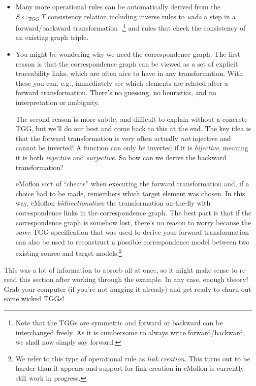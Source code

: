 \begin{itemize}

\item Many more operational rules can be automatically derived from the $S \Leftrightarrow_{TGG} T$ consistency relation including inverse rules to \emph{undo} a step in a forward/backward transformation~\cite{LAVS_ICGT_2012},\footnote{Note that the TGGs are symmetric and forward or backward can be interchanged freely. 
As it is cumbersome to always write forward/backward, we shall now simply say forward.} and rules that check the consistency of an existing graph triple.

\item You might be wondering why we need the correspondence graph. 
The first reason is that the correspondence graph can be viewed as a set of explicit traceability links, which are often nice to have in any transformation. 
With these you can, e.g., immediately see which elements are related after a forward transformation. 
There's no guessing, no heuristics, and no interpretation or ambiguity.

\vspace{0.25cm}

The second reason is more subtle, and difficult to explain without a concrete TGG, but we'll do our best and come back to this at the end. 
The key idea is that the forward transformation is very often actually \emph{not} injective and cannot be inverted! 
A function can only be inverted if it is \emph{bijective}, meaning it is both \emph{injective} and \emph{surjective}. 
So how can we derive the backward transformation?

\vspace{0.25cm}

eMoflon sort of ``cheats'' when executing the forward transformation and, if a choice had to be made, remembers which target element was chosen. 
In this way, eMoflon \emph{bidirectionalize}s the transformation on-the-fly with correspondence links in the correspondence graph. 
The best part is that if the correspondence graph is somehow lost, there's no reason to worry because the \emph{same} TGG specification that was used to derive your forward transformation
can also be used to reconstruct a possible correspondence model between two existing source and target models.\footnote{We refer to this type of operational rule as \emph{link creation}. 
This turns out to be harder than it appears and support for link creation in eMoflon is currently still work in progress.}

\end{itemize}
This was a lot of information to absorb all at once, so it might make sense to re-read this section after working through the example.
In any case, enough theory! 
Grab your computer (if you're not hugging it already) and get ready to churn out some wicked TGGs!

